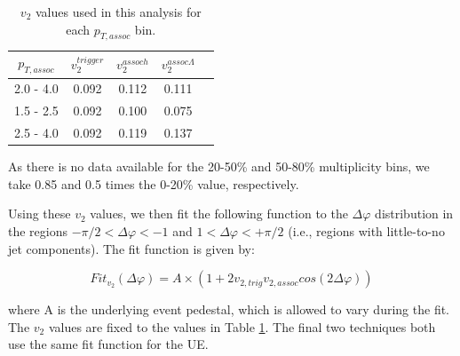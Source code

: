 \begin{table}[h!]
\centering
\begin{tabular}{| c || c | c | c | c | }
\hline
$p_{T, assoc}$ & $v_{2}^{trigger}$ & $v_{2}^{assoc h}$ & $v_{2}^{assoc \Lambda}$ \\
\hline
2.0 - 4.0 & 0.092 & 0.112 & 0.111 \\
1.5 - 2.5 & 0.092 & 0.100 & 0.075 \\
2.5 - 4.0 & 0.092 & 0.119 & 0.137 \\
\hline
\end{tabular}
\caption{$v_{2}$ values used in this analysis for each $p_{T, assoc}$ bin.}
\label{v2_table}
\end{table}

As there is no data available for the 20-50\% and 50-80\% multiplicity bins, we take 0.85 and 0.5 times the 0-20\% value, respectively. 

Using these $v_{2}$ values, we then fit the following function to the $\Delta\varphi$ distribution in the regions $-\pi/2 < \Delta\varphi < -1$ and $1 < \Delta\varphi < +\pi/2$ (i.e., regions with little-to-no jet components). The fit function is given by:

\begin{equation}
Fit_{v_{2}}(\Delta\varphi) = A\times(1 + 2v_{2, trig}v_{2, assoc}cos(2\Delta\varphi))
\end{equation}

where A is the underlying event pedestal, which is allowed to vary during the fit. The $v_{2}$ values are fixed to the values in Table \ref{v2_table}. The final two techniques both use the same fit function for the UE.




